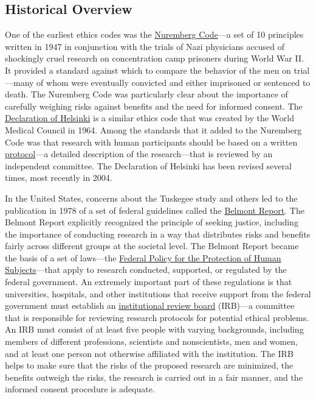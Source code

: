 \documentclass[
]{krantz}
\begin{document}
\hypertarget{historical-overview}{%
\subsection*{Historical Overview}\label{historical-overview}}


One of the earliest ethics codes was the \protect\hyperlink{nuremberg-code}{Nuremberg Code}---a set of 10 principles written in 1947 in conjunction with the trials of Nazi physicians accused of shockingly cruel research on concentration camp prisoners during World War II. It provided a standard against which to compare the behavior of the men on trial---many of whom were eventually convicted and either imprisoned or sentenced to death. The Nuremberg Code was particularly clear about the importance of carefully weighing risks against benefits and the need for informed consent. The \protect\hyperlink{declaration-of-helsinki}{Declaration of Helsinki} is a similar ethics code that was created by the World Medical Council in 1964. Among the standards that it added to the Nuremberg Code was that research with human participants should be based on a written \protect\hyperlink{protocol}{protocol}---a detailed description of the research---that is reviewed by an independent committee. The Declaration of Helsinki has been revised several times, most recently in 2004.

In the United States, concerns about the Tuskegee study and others led to the publication in 1978 of a set of federal guidelines called the \protect\hyperlink{belmont-report}{Belmont Report}. The Belmont Report explicitly recognized the principle of seeking justice, including the importance of conducting research in a way that distributes risks and benefits fairly across different groups at the societal level. The Belmont Report became the basis of a set of laws---the \protect\hyperlink{federal-policy-for-the-protection-of-human-subjects}{Federal Policy for the Protection of Human Subjects}---that apply to research conducted, supported, or regulated by the federal government. An extremely important part of these regulations is that universities, hospitals, and other institutions that receive support from the federal government must establish an \protect\hyperlink{institutional-review-board}{institutional review board} (IRB)---a committee that is responsible for reviewing research protocols for potential ethical problems. An IRB must consist of at least five people with varying backgrounds, including members of different professions, scientists and nonscientists, men and women, and at least one person not otherwise affiliated with the institution. The IRB helps to make sure that the risks of the proposed research are minimized, the benefits outweigh the risks, the research is carried out in a fair manner, and the informed consent procedure is adequate.
\end{document}
